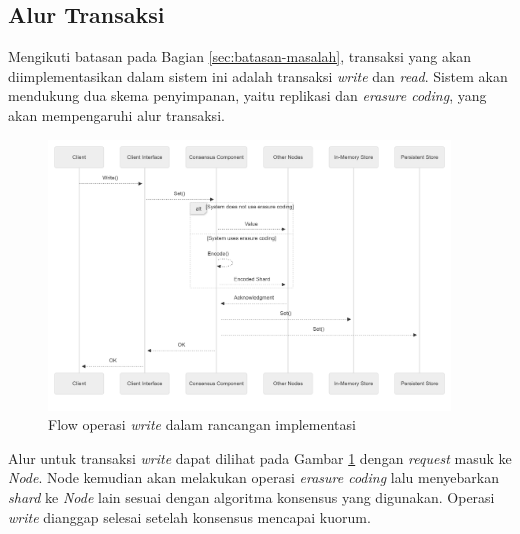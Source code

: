 \subsection{Alur Transaksi}
\label{subsection:system-flow}

Mengikuti batasan pada Bagian \ref{sec:batasan-masalah}, transaksi yang akan diimplementasikan dalam sistem ini adalah transaksi \textit{write} dan \textit{read}. Sistem akan mendukung dua skema penyimpanan, yaitu replikasi dan \textit{erasure coding}, yang akan mempengaruhi alur transaksi.

\begin{figure}[!ht]
    \centering
    \includegraphics[width=0.95\textwidth]{resources/chapter-3/flow-write.png}
    \caption{Flow operasi \textit{write} dalam rancangan implementasi}
    \label{fig:flow-write-mermaidjs}
\end{figure}

Alur untuk transaksi \textit{write} dapat dilihat pada Gambar \ref{fig:flow-write-mermaidjs} dengan \textit{request} masuk ke \textit{Node}. Node kemudian akan melakukan operasi \textit{erasure coding} lalu menyebarkan \textit{shard} ke \textit{Node} lain sesuai dengan algoritma konsensus yang digunakan. Operasi \textit{write} dianggap selesai setelah konsensus mencapai kuorum.

